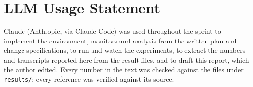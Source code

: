 \documentclass[11pt,a4paper]{article}
\begin{document}
\section*{LLM Usage Statement}
Claude (Anthropic, via Claude Code) was used throughout the sprint to implement the environment, monitors and analysis from the written plan and change specifications, to run and watch the experiments, to extract the numbers and transcripts reported here from the result files, and to draft this report, which the author edited. Every number in the text was checked against the files under \texttt{results/}; every reference was verified against its source.
\end{document}
